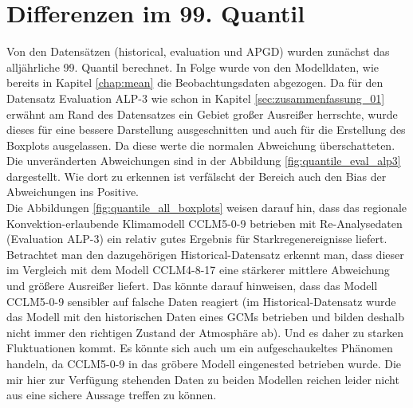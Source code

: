 \section{Differenzen im 99. Quantil} \label{sec:diff_q99}
Von den Datensätzen (historical, evaluation und APGD) wurden zunächst das alljährliche 99. Quantil berechnet. In Folge wurde von den Modelldaten, wie bereits in Kapitel \ref{chap:mean} die Beobachtungsdaten abgezogen. Da für den Datensatz Evaluation ALP-3 wie schon in Kapitel \ref{sec:zusammenfassung_01} erwähnt am Rand des Datensatzes ein Gebiet großer Ausreißer herrschte, wurde dieses für eine bessere Darstellung ausgeschnitten und auch für die Erstellung des Boxplots ausgelassen. Da diese werte die normalen Abweichung überschatteten. Die unveränderten Abweichungen sind in der Abbildung \ref{fig:quantile_eval_alp3} dargestellt. Wie dort zu erkennen ist verfälscht der Bereich auch den Bias der Abweichungen ins Positive.\\
Die Abbildungen \ref{fig:quantile_all_boxplots} weisen darauf hin, dass das regionale Konvektion-erlaubende Klimamodell CCLM5-0-9 betrieben mit Re-Analysedaten (Evaluation ALP-3) ein relativ gutes Ergebnis für Starkregenereignisse liefert. Betrachtet man den dazugehörigen Historical-Datensatz erkennt man, dass dieser im Vergleich mit dem Modell CCLM4-8-17 eine stärkerer mittlere Abweichung und größere Ausreißer liefert. Das könnte darauf hinweisen, dass das Modell CCLM5-0-9 sensibler auf falsche Daten reagiert (im Historical-Datensatz wurde das Modell mit den historischen Daten eines GCMs betrieben und bilden deshalb nicht immer den richtigen Zustand der Atmosphäre ab). Und es daher zu starken Fluktuationen kommt. Es könnte sich auch um ein aufgeschaukeltes Phänomen handeln, da CCLM5-0-9 in das gröbere Modell eingenested betrieben wurde. Die mir hier zur Verfügung stehenden Daten zu beiden Modellen reichen leider nicht aus eine sichere Aussage treffen zu können.\\

